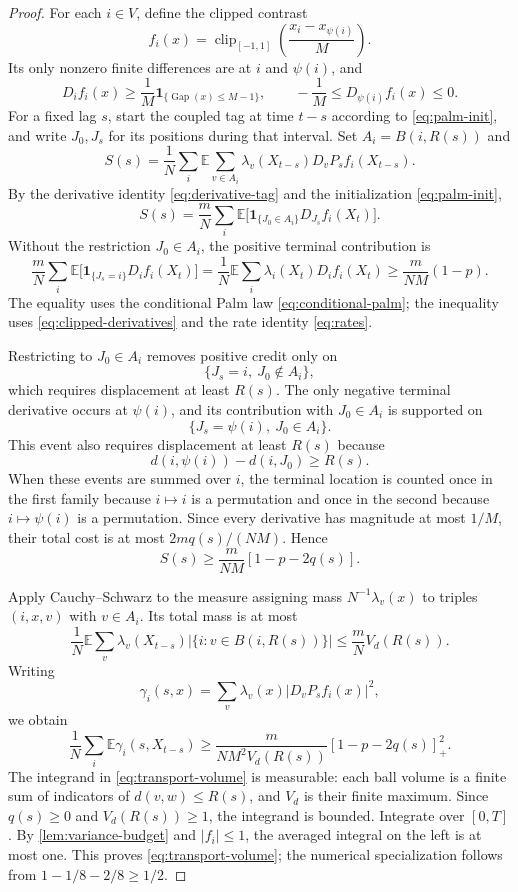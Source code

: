 \documentclass[11pt]{article}
\theoremstyle{remark}
\newcommand{\E}{\mathbb{E}}
\newcommand{\one}{\mathbf{1}}
\newcommand{\Gap}{\operatorname{Gap}}
\newcommand{\clip}{\operatorname{clip}}
\begin{document}
\begin{proof}
For each $i\in V$, define the clipped contrast
\[
 f_i(x)=\clip_{[-1,1]}\!\left(\frac{x_i-x_{\psi(i)}}M\right).
\]
Its only nonzero finite differences are at $i$ and $\psi(i)$, and
\[
 D_if_i(x)\ge\frac1M\one_{\{\Gap(x)\le M-1\}},
 \qquad
 -\frac1M\le D_{\psi(i)}f_i(x)\le0.
 \tag{5.6}\label{eq:clipped-derivatives}
\]
For a fixed lag $s$, start the coupled tag at time $t-s$ according to \eqref{eq:palm-init}, and write $J_0,J_s$ for its positions during that interval. Set $A_i=B(i,R(s))$ and
\[
 S(s)=\frac1N\sum_i\E\sum_{v\in A_i}
 \lambda_v(X_{t-s})D_vP_sf_i(X_{t-s}).
\]
By the derivative identity \eqref{eq:derivative-tag} and the initialization \eqref{eq:palm-init},
\[
 S(s)=\frac mN\sum_i\E\bigl[
 \one_{\{J_0\in A_i\}}D_{J_s}f_i(X_t)
 \bigr].
 \tag{5.7}\label{eq:transport-palm}
\]
Without the restriction $J_0\in A_i$, the positive terminal contribution is
\[
 \frac mN\sum_i\E\bigl[
 \one_{\{J_s=i\}}D_if_i(X_t)
 \bigr]
 =\frac1N\E\sum_i\lambda_i(X_t)D_if_i(X_t)
 \ge\frac m{NM}(1-p).
 \tag{5.8}\label{eq:positive-credit}
\]
The equality uses the conditional Palm law \eqref{eq:conditional-palm}; the inequality uses \eqref{eq:clipped-derivatives} and the rate identity \eqref{eq:rates}.

Restricting to $J_0\in A_i$ removes positive credit only on
\[
 \{J_s=i,\ J_0\notin A_i\},
\]
which requires displacement at least $R(s)$. The only negative terminal derivative occurs at $\psi(i)$, and its contribution with $J_0\in A_i$ is supported on
\[
 \{J_s=\psi(i),\ J_0\in A_i\}.
\]
This event also requires displacement at least $R(s)$ because
\[
 d(i,\psi(i))-d(i,J_0)\ge R(s).
\]
When these events are summed over $i$, the terminal location is counted once in the first family because $i\mapsto i$ is a permutation and once in the second because $i\mapsto\psi(i)$ is a permutation. Since every derivative has magnitude at most $1/M$, their total cost is at most $2mq(s)/(NM)$. Hence
\[
 S(s)\ge\frac m{NM}[1-p-2q(s)].
 \tag{5.9}\label{eq:mean-response}
\]

Apply Cauchy--Schwarz to the measure assigning mass $N^{-1}\lambda_v(x)$ to triples $(i,x,v)$ with $v\in A_i$. Its total mass is at most
\[
 \frac1N\E\sum_v\lambda_v(X_{t-s})
       |\{i:v\in B(i,R(s))\}|
 \le\frac mN V_d(R(s)).
\]
Writing
\[
 \gamma_i(s,x)=\sum_v\lambda_v(x)|D_vP_sf_i(x)|^2,
\]
we obtain
\[
 \frac1N\sum_i\E\gamma_i(s,X_{t-s})
 \ge\frac m{NM^2V_d(R(s))}[1-p-2q(s)]_+^2.
 \tag{5.10}\label{eq:energy-lower}
\]
The integrand in \eqref{eq:transport-volume} is measurable: each ball volume is a finite sum of indicators of $d(v,w)\le R(s)$, and $V_d$ is their finite maximum. Since $q(s)\ge0$ and $V_d(R(s))\ge1$, the integrand is bounded. Integrate over $[0,T]$. By \cref{lem:variance-budget} and $|f_i|\le1$, the averaged integral on the left is at most one. This proves \eqref{eq:transport-volume}; the numerical specialization follows from $1-1/8-2/8\ge1/2$.
\end{proof}
\end{document}

